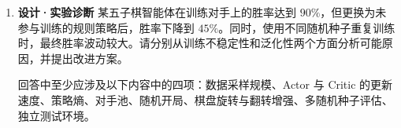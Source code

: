 \documentclass[UTF8,a4paper,zihao=-4,oneside,openany]{ctexbook}
\begin{document}
\begin{exercisebox}
\begin{enumerate}
    \item \textbf{设计·实验诊断} 某五子棋智能体在训练对手上的胜率达到 $90\%$，但更换为未参与训练的规则策略后，胜率下降到 $45\%$。同时，使用不同随机种子重复训练时，最终胜率波动较大。请分别从训练不稳定性和泛化性两个方面分析可能原因，并提出改进方案。

    回答中至少应涉及以下内容中的四项：数据采样规模、Actor 与 Critic 的更新速度、策略熵、对手池、随机开局、棋盘旋转与翻转增强、多随机种子评估、独立测试环境。
  \end{enumerate}
\end{exercisebox}
\end{document}
